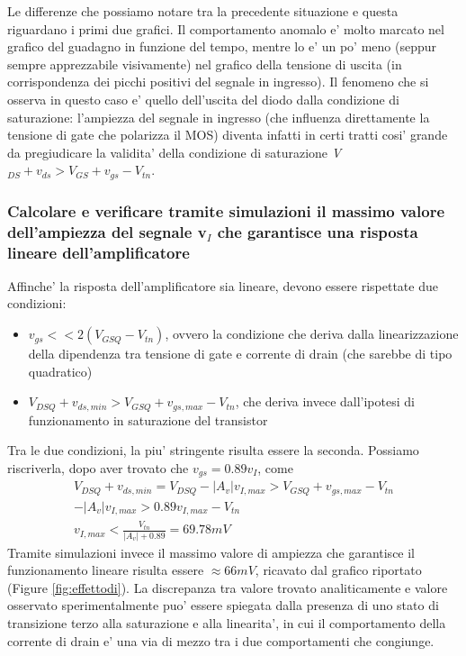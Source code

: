 \documentclass[a4paper,10pt]{article}
\begin{document}
Le differenze che possiamo notare tra la precedente situazione e questa riguardano i primi due grafici. Il comportamento anomalo e' molto marcato nel grafico del guadagno in funzione del tempo, mentre lo e' un po' meno (seppur sempre apprezzabile visivamente) nel grafico della tensione di uscita (in corrispondenza dei picchi positivi del segnale in ingresso). Il fenomeno che si osserva in questo caso e' quello dell'uscita del diodo dalla condizione di saturazione: l'ampiezza del segnale in ingresso (che influenza direttamente la tensione di gate che polarizza il MOS) diventa infatti in certi tratti cosi' grande da pregiudicare la validita' della condizione di saturazione \textit{V$_{DS} + v_{ds} > V_{GS} + v_{gs} - V_{tn}$}. 

\subsubsection{Calcolare e verificare tramite simulazioni il massimo valore dell'ampiezza del segnale v$_I$ che garantisce una risposta lineare dell'amplificatore}
Affinche' la risposta dell'amplificatore sia lineare, devono essere rispettate due condizioni:
\begin{itemize}
 	\item \textit{$v_{gs} << 2(V_{GSQ}-V_{tn})$}, ovvero la condizione che deriva dalla linearizzazione della dipendenza tra tensione di gate e corrente di drain (che sarebbe di tipo quadratico)
 	\item \textit{$V_{DSQ} + v_{ds,min} > V_{GSQ}+v_{gs,max}-V_{tn}$}, che deriva invece dall'ipotesi di funzionamento in saturazione del transistor 
\end{itemize}
Tra le due condizioni, la piu' stringente risulta essere la seconda. Possiamo riscriverla, dopo aver trovato che $v_{gs}=0.89v_I$, come
\begin{gather*}
V_{DSQ} + v_{ds,min} = V_{DSQ} - |A_v|v_{I,max} > V_{GSQ}+v_{gs,max}-V_{tn} \\
-|A_v|v_{I,max} > 0.89v_{I,max} - V_{tn} \\
v_{I,max} < \frac{V_{tn}}{|A_v|+0.89} = 69.78mV
\end{gather*}
Tramite simulazioni invece il massimo valore di ampiezza che garantisce il funzionamento lineare risulta essere $\approx 66mV$, ricavato dal grafico riportato (Figure \ref{fig:effettodi}). La discrepanza tra valore trovato analiticamente e valore osservato sperimentalmente puo' essere spiegata dalla presenza di uno stato di transizione terzo alla saturazione e alla linearita', in cui il comportamento della corrente di drain e' una via di mezzo tra i due comportamenti che congiunge.
\end{document}
